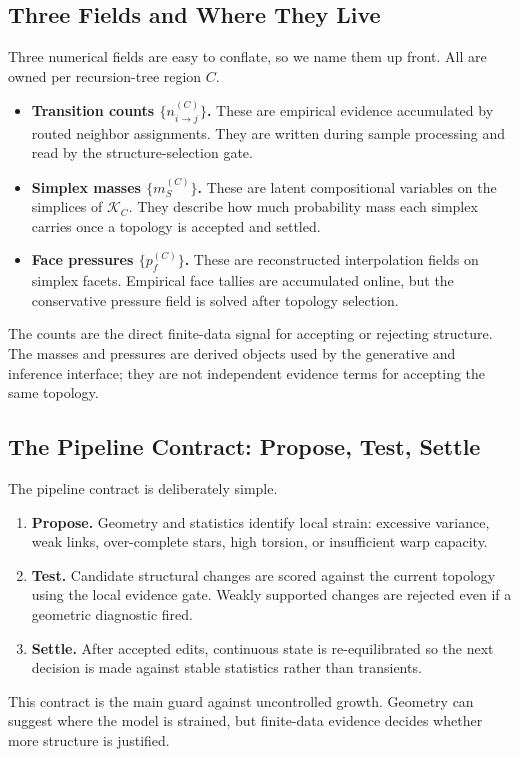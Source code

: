 \documentclass[11pt]{article}
\theoremstyle{definition}
\theoremstyle{plain}
\begin{document}
\subsection{Three Fields and Where They Live}
Three numerical fields are easy to conflate, so we name them up front. All are owned per recursion-tree region $C$.
\begin{itemize}[leftmargin=1.5em]
    \item \textbf{Transition counts $\{n_{i\to j}^{(C)}\}$.} These are empirical evidence accumulated by routed neighbor assignments. They are written during sample processing and read by the structure-selection gate.
    \item \textbf{Simplex masses $\{m_S^{(C)}\}$.} These are latent compositional variables on the simplices of $\mathcal K_C$. They describe how much probability mass each simplex carries once a topology is accepted and settled.
    \item \textbf{Face pressures $\{p_f^{(C)}\}$.} These are reconstructed interpolation fields on simplex facets. Empirical face tallies are accumulated online, but the conservative pressure field is solved after topology selection.
\end{itemize}
The counts are the direct finite-data signal for accepting or rejecting structure. The masses and pressures are derived objects used by the generative and inference interface; they are not independent evidence terms for accepting the same topology.

\subsection{The Pipeline Contract: Propose, Test, Settle}
The pipeline contract is deliberately simple.
\begin{enumerate}[leftmargin=1.5em]
    \item \textbf{Propose.} Geometry and statistics identify local strain: excessive variance, weak links, over-complete stars, high torsion, or insufficient warp capacity.
    \item \textbf{Test.} Candidate structural changes are scored against the current topology using the local evidence gate. Weakly supported changes are rejected even if a geometric diagnostic fired.
    \item \textbf{Settle.} After accepted edits, continuous state is re-equilibrated so the next decision is made against stable statistics rather than transients.
\end{enumerate}
This contract is the main guard against uncontrolled growth. Geometry can suggest where the model is strained, but finite-data evidence decides whether more structure is justified.
\end{document}
